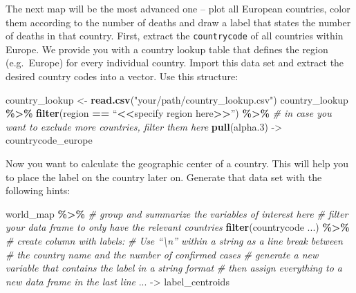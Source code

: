 \documentclass[
  11pt,
]{article}
\newenvironment{Shaded}{\begin{snugshade}}{\end{snugshade}}
\newcommand{\CommentTok}[1]{\textcolor[rgb]{0.56,0.35,0.01}{\textit{#1}}}
\newcommand{\ErrorTok}[1]{\textcolor[rgb]{0.64,0.00,0.00}{\textbf{#1}}}
\newcommand{\FloatTok}[1]{\textcolor[rgb]{0.00,0.00,0.81}{#1}}
\newcommand{\KeywordTok}[1]{\textcolor[rgb]{0.13,0.29,0.53}{\textbf{#1}}}
\newcommand{\NormalTok}[1]{#1}
\newcommand{\OperatorTok}[1]{\textcolor[rgb]{0.81,0.36,0.00}{\textbf{#1}}}
\newcommand{\StringTok}[1]{\textcolor[rgb]{0.31,0.60,0.02}{#1}}
\newenvironment{tips}[1]
  {
  \begin{itemize}
  \footnotesize
  \renewcommand{\labelitemi}{
    \raisebox{-.7\height}[0pt][0pt]{
      {\setkeys{Gin}{width=3em,keepaspectratio}
        \texttt{[image: images/\#1.png]}}
    }
  }
  \setlength{\fboxsep}{1em}
  \begin{rbox}
  \item
  }
  {
  \end{rbox}
  \end{itemize}
  }
\begin{document}
\begin{tips}r

The next map will be the most advanced one -- plot all European countries, color them according to the number of deaths and draw a label that states the number of deaths in that country. First, extract the \texttt{countrycode} of all countries within Europe. We provide you with a country lookup table that defines the region (e.g.~Europe) for every individual country. Import this data set and extract the desired country codes into a vector. Use this structure:

\begin{Shaded}
\begin{Highlighting}[]
\NormalTok{country\_lookup \textless{}{-}}\StringTok{ }\KeywordTok{read.csv}\NormalTok{(}\StringTok{"your/path/country\_lookup.csv"}\NormalTok{)}
\NormalTok{country\_lookup }\OperatorTok{\%\textgreater{}\%}\StringTok{ }
\StringTok{  }\KeywordTok{filter}\NormalTok{(region }\OperatorTok{==}\StringTok{ }\NormalTok{“}\OperatorTok{\textless{}}\ErrorTok{\textless{}}\NormalTok{specify region here}\OperatorTok{\textgreater{}}\ErrorTok{\textgreater{}}\NormalTok{”) }\OperatorTok{\%\textgreater{}\%}
\StringTok{  }\CommentTok{\# in case you want to exclude more countries, filter them here         }
\StringTok{  }\KeywordTok{pull}\NormalTok{(alpha}\FloatTok{.3}\NormalTok{) {-}\textgreater{}}\StringTok{ }\NormalTok{countrycode\_europe}
\end{Highlighting}
\end{Shaded}

Now you want to calculate the geographic center of a country. This will help you to place the label on the country later on. Generate that data set with the following hints:

\begin{Shaded}
\begin{Highlighting}[]
\NormalTok{world\_map }\OperatorTok{\%\textgreater{}\%}\StringTok{ }
\CommentTok{\# group and summarize the variables of interest here  }
\CommentTok{\# filter your data frame to only have the relevant countries}
\StringTok{  }\KeywordTok{filter}\NormalTok{(countrycode ...) }\OperatorTok{\%\textgreater{}\%}
\CommentTok{\# create column with labels:}
\CommentTok{\# Use “\textbackslash{}n” within a string as a line break between }
\CommentTok{\# the country name and the number of confirmed cases}
\CommentTok{\# generate a new variable that contains the label in a string format}
\CommentTok{\# then assign everything to a new data frame in the last line}
\NormalTok{... {-}\textgreater{}}\StringTok{ }\NormalTok{label\_centroids}
\end{Highlighting}
\end{Shaded}


\end{tips}
\end{document}
